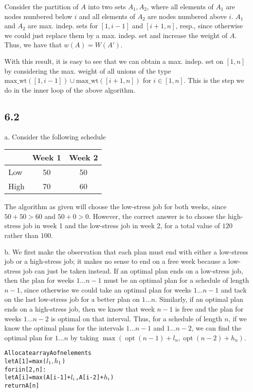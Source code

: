 \documentclass{article}
\DeclareMathOperator{\opt}{opt}
\begin{document}
Consider the partition of $A$ into two sets $A_1,A_2$, where all elements of $A_1$ are nodes numbered below $i$ and all elements of $A_2$ are nodes numbered above $i$. $A_1$ and $A_2$ are max. indep. sets for $[1,i-1]$ and $[i+1,n]$, resp., since otherwise we could just replace them by a max. indep. set and increase the weight of $A$. Thus, we have that $w(A)=W(A')$.

With this result, it is easy to see that we can obtain a max. indep. set on $[1,n]$ by considering the max. weight of all unions of the type $\text{max\_wt}([1,i-1])\cup\text{max\_wt}([i+1,n])$ for $i\in[1,n]$. This is the step we do in the inner loop of the above algorithm. 
\subsection*{6.2}
a. Consider the following schedule

\begin{tabular}{l|cc}
&Week 1&Week 2\\
\hline
Low&50&50\\
High&70&60\\
\end{tabular}

The algorithm as given will choose the low-stress job for both weeks, since $50+50>60$ and $50+0>0$. However, the correct answer is to choose the high-stress job in week 1 and the low-stress job in week 2, for a total value of $120$ rather than $100$.

\noindent b. We first make the observation that each plan must end with either a low-stress job or a high-stress job; it makes no sense to end on a free week because a low-stress job can just be taken instead. If an optimal plan ends on a low-stress job, then the plan for weeks $1\ldots n-1$ must be an optimal plan for a schedule of length $n-1$, since otherwise we could take an optimal plan for weeks $1\ldots n-1$ and tack on the last low-stress job for a better plan on $1\ldots n$. Similarly, if an optimal plan ends on a high-stress job, then we know that week $n-1$ is free and the plan for weeks $1\ldots n-2$ is optimal on that interval. Thus, for a schedule of length $n$, if we know the optimal plans for the intervals $1\ldots n-1$ and $1\ldots n-2$, we can find the optimal plan for $1\ldots n$ by taking $\max(\opt(n-1)+l_n,\opt(n-2)+h_n)$.
\begin{alltt}
Allocate array A of n elements
let A[1]=max(\(l\sb{1},h\sb{1}\))
for i in [2,n]:
    let A[i]=max(A[i-1]+\(l\sb{i}\),A[i-2]+\(h\sb{i}\))
return A[n]
\end{alltt}
\end{document}
